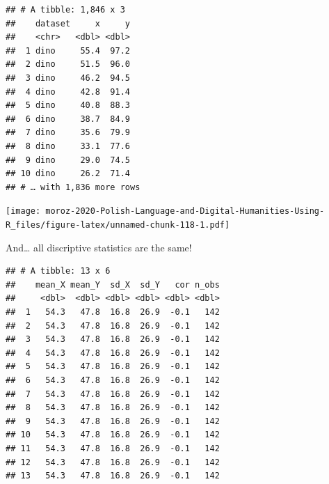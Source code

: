 \documentclass[
]{book}
\newenvironment{Shaded}{\begin{snugshade}}{\end{snugshade}}
\newcommand{\DataTypeTok}[1]{\textcolor[rgb]{0.13,0.29,0.53}{#1}}
\newcommand{\DecValTok}[1]{\textcolor[rgb]{0.00,0.00,0.81}{#1}}
\newcommand{\KeywordTok}[1]{\textcolor[rgb]{0.13,0.29,0.53}{\textbf{#1}}}
\newcommand{\NormalTok}[1]{#1}
\newcommand{\OperatorTok}[1]{\textcolor[rgb]{0.81,0.36,0.00}{\textbf{#1}}}
\newcommand{\StringTok}[1]{\textcolor[rgb]{0.31,0.60,0.02}{#1}}
\begin{document}
\begin{verbatim}
## # A tibble: 1,846 x 3
##    dataset     x     y
##    <chr>   <dbl> <dbl>
##  1 dino     55.4  97.2
##  2 dino     51.5  96.0
##  3 dino     46.2  94.5
##  4 dino     42.8  91.4
##  5 dino     40.8  88.3
##  6 dino     38.7  84.9
##  7 dino     35.6  79.9
##  8 dino     33.1  77.6
##  9 dino     29.0  74.5
## 10 dino     26.2  71.4
## # … with 1,836 more rows
\end{verbatim}

\texttt{[image: moroz-2020-Polish-Language-and-Digital-Humanities-Using-R\_files/figure-latex/unnamed-chunk-118-1.pdf]}

And\ldots{} all discriptive statistics are the same!

\begin{Shaded}
\end{Shaded}

\begin{verbatim}
## # A tibble: 13 x 6
##    mean_X mean_Y  sd_X  sd_Y   cor n_obs
##     <dbl>  <dbl> <dbl> <dbl> <dbl> <dbl>
##  1   54.3   47.8  16.8  26.9  -0.1   142
##  2   54.3   47.8  16.8  26.9  -0.1   142
##  3   54.3   47.8  16.8  26.9  -0.1   142
##  4   54.3   47.8  16.8  26.9  -0.1   142
##  5   54.3   47.8  16.8  26.9  -0.1   142
##  6   54.3   47.8  16.8  26.9  -0.1   142
##  7   54.3   47.8  16.8  26.9  -0.1   142
##  8   54.3   47.8  16.8  26.9  -0.1   142
##  9   54.3   47.8  16.8  26.9  -0.1   142
## 10   54.3   47.8  16.8  26.9  -0.1   142
## 11   54.3   47.8  16.8  26.9  -0.1   142
## 12   54.3   47.8  16.8  26.9  -0.1   142
## 13   54.3   47.8  16.8  26.9  -0.1   142
\end{verbatim}
\end{document}
